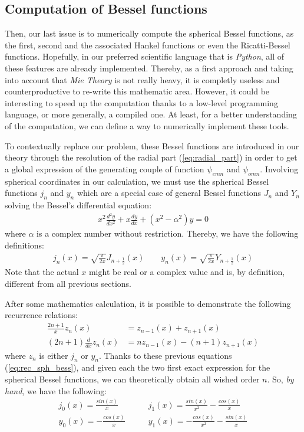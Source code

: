 \documentclass{article}
\numberwithin{equation}{section}
\begin{document}
\subsection{Computation of Bessel functions}

Then, our last issue is to numerically compute the spherical Bessel functions, as the first, second and the associated Hankel functions or even the Ricatti-Bessel functions. Hopefully, in our preferred scientific language that is \textit{Python}, all of these features are already implemented. Thereby, as a first approach and taking into account that \textit{Mie Theory} is not really heavy, it is completly useless and counterproductive to re-write this mathematic area. However, it could be interesting to speed up the computation thanks to a low-level programming language, or more generally, a compiled one. At least, for a better understanding of the computation, we can define a way to numerically implement these tools.

To contextually replace our problem, these Bessel functions are introduced in our theory through the resolution of the radial part (\ref{eq:radial_part}) in order to get a global expression of the generating couple of function $\psi_{emn}$ and $\psi_{omn}$. Involving spherical coordinates in our calculation, we must use the spherical Bessel functions $j_{n}$ and $y_{n}$ which are a special case of general Bessel functions $J_{n}$ and $Y_{n}$ solving the Bessel's differential equation:
\begin{align}
x^{2}\frac{d^{2}y}{dx^{2}} + x\frac{dy}{dx} + (x^{2} - \alpha^{2})y = 0
\end{align}
where $\alpha$ is a complex number without restriction. Thereby, we have the following definitions:
\begin{align}
j_{n}(x)=\sqrt{\frac{\pi}{2x}}J_{n+\frac{1}{2}}(x) \qquad y_{n}(x)=\sqrt{\frac{\pi}{2x}}Y_{n+\frac{1}{2}}(x)
\end{align}
Note that the actual $x$ might be real or a complex value and is, by definition, different from all previous sections.

After some mathematics calculation, it is possible to demonstrate the following recurrence relations:
\begin{align}\label{eq:rec_sph_bess}
\frac{2n+1}{x}z_{n}(x) &= z_{n-1}(x) + z_{n+1}(x)\\
(2n+1)\frac{d}{dx}z_{n}(x) &= nz_{n-1}(x) - (n+1)z_{n+1}(x)
\end{align}
where $z_{n}$ is either $j_{n}$ or $y_{n}$. Thanks to these previous equations (\ref{eq:rec_sph_bess}), and given each the two first exact expression for the spherical Bessel functions, we can theoretically obtain all wished order $n$. So, \textit{by hand}, we have the following:
\begin{equation}
\begin{aligned}
j_{0}(x)=\frac{sin(x)}{x} \qquad &j_{1}(x)=\frac{sin(x)}{x^{2}} - \frac{cos(x)}{x}\\
y_{0}(x)=-\frac{cos(x)}{x} \qquad &y_{1}(x)=-\frac{cos(x)}{x^{2}}-\frac{sin(x)}{x}
\end{aligned}
\end{equation}
\end{document}

